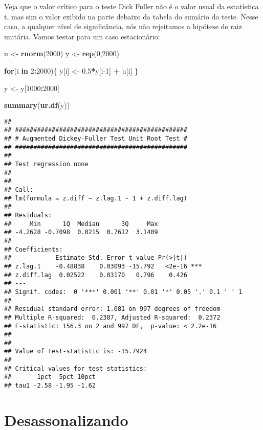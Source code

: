 \documentclass[
]{book}
\newenvironment{Shaded}{\begin{snugshade}}{\end{snugshade}}
\newcommand{\ControlFlowTok}[1]{\textcolor[rgb]{0.13,0.29,0.53}{\textbf{#1}}}
\newcommand{\DecValTok}[1]{\textcolor[rgb]{0.00,0.00,0.81}{#1}}
\newcommand{\FloatTok}[1]{\textcolor[rgb]{0.00,0.00,0.81}{#1}}
\newcommand{\KeywordTok}[1]{\textcolor[rgb]{0.13,0.29,0.53}{\textbf{#1}}}
\newcommand{\NormalTok}[1]{#1}
\newcommand{\OperatorTok}[1]{\textcolor[rgb]{0.81,0.36,0.00}{\textbf{#1}}}
\newcommand{\StringTok}[1]{\textcolor[rgb]{0.31,0.60,0.02}{#1}}
\begin{document}
Veja que o valor crítico para o teste Dick Fuller não é o valor usual da estatística t, mas sim o valor exibido na parte debaixo da tabela do sumário do teste. Nesse caso, a qualquer nível de significância, nós não rejeitamos a hipótese de raiz unitária. Vamos testar para um caso estacionário:

\begin{Shaded}
\begin{Highlighting}[]
\NormalTok{u \textless{}{-}}\StringTok{ }\KeywordTok{rnorm}\NormalTok{(}\DecValTok{2000}\NormalTok{)}
\NormalTok{y \textless{}{-}}\StringTok{ }\KeywordTok{rep}\NormalTok{(}\DecValTok{0}\NormalTok{,}\DecValTok{2000}\NormalTok{)}

\ControlFlowTok{for}\NormalTok{(i }\ControlFlowTok{in} \DecValTok{2}\OperatorTok{:}\DecValTok{2000}\NormalTok{)\{}
\NormalTok{  y[i] \textless{}{-}}\StringTok{ }\FloatTok{0.5}\OperatorTok{*}\NormalTok{y[i}\DecValTok{{-}1}\NormalTok{] }\OperatorTok{+}\StringTok{ }\NormalTok{u[i]}
\NormalTok{\}}

\NormalTok{y \textless{}{-}}\StringTok{ }\NormalTok{y[}\DecValTok{1000}\OperatorTok{:}\DecValTok{2000}\NormalTok{]}

\KeywordTok{summary}\NormalTok{(}\KeywordTok{ur.df}\NormalTok{(y))}
\end{Highlighting}
\end{Shaded}

\begin{verbatim}
## 
## ############################################### 
## # Augmented Dickey-Fuller Test Unit Root Test # 
## ############################################### 
## 
## Test regression none 
## 
## 
## Call:
## lm(formula = z.diff ~ z.lag.1 - 1 + z.diff.lag)
## 
## Residuals:
##     Min      1Q  Median      3Q     Max 
## -4.2628 -0.7098  0.0215  0.7612  3.1409 
## 
## Coefficients:
##            Estimate Std. Error t value Pr(>|t|)    
## z.lag.1    -0.48838    0.03093 -15.792   <2e-16 ***
## z.diff.lag  0.02522    0.03170   0.796    0.426    
## ---
## Signif. codes:  0 '***' 0.001 '**' 0.01 '*' 0.05 '.' 0.1 ' ' 1
## 
## Residual standard error: 1.081 on 997 degrees of freedom
## Multiple R-squared:  0.2387, Adjusted R-squared:  0.2372 
## F-statistic: 156.3 on 2 and 997 DF,  p-value: < 2.2e-16
## 
## 
## Value of test-statistic is: -15.7924 
## 
## Critical values for test statistics: 
##       1pct  5pct 10pct
## tau1 -2.58 -1.95 -1.62
\end{verbatim}

\hypertarget{desassonalizando}{%
\section{Desassonalizando}\label{desassonalizando}}
\end{document}
